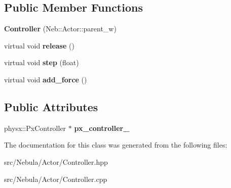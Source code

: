 \subsection*{\-Public \-Member \-Functions}
\begin{DoxyCompactItemize}
\item 
\hypertarget{classNeb_1_1Actor_1_1Controller_a0d5d6a76be71f3cf05c6e3d892719d3e}{{\bfseries \-Controller} (\-Neb\-::\-Actor\-::parent\-\_\-w)}\label{classNeb_1_1Actor_1_1Controller_a0d5d6a76be71f3cf05c6e3d892719d3e}

\item 
\hypertarget{classNeb_1_1Actor_1_1Controller_a4cf7cbd70138ea33c509d89ebc74e45d}{virtual void {\bfseries release} ()}\label{classNeb_1_1Actor_1_1Controller_a4cf7cbd70138ea33c509d89ebc74e45d}

\item 
\hypertarget{classNeb_1_1Actor_1_1Controller_a37d671a837e578ee05e2f9e1a5292e79}{virtual void {\bfseries step} (float)}\label{classNeb_1_1Actor_1_1Controller_a37d671a837e578ee05e2f9e1a5292e79}

\item 
\hypertarget{classNeb_1_1Actor_1_1Controller_aed64790b9ac840ebb4e6da3af3a6e405}{virtual void {\bfseries add\-\_\-force} ()}\label{classNeb_1_1Actor_1_1Controller_aed64790b9ac840ebb4e6da3af3a6e405}

\end{DoxyCompactItemize}
\subsection*{\-Public \-Attributes}
\begin{DoxyCompactItemize}
\item 
\hypertarget{classNeb_1_1Actor_1_1Controller_a488fba03acad68f997a3f38f4fac41fd}{physx\-::\-Px\-Controller $\ast$ {\bfseries px\-\_\-controller\-\_\-}}\label{classNeb_1_1Actor_1_1Controller_a488fba03acad68f997a3f38f4fac41fd}

\end{DoxyCompactItemize}


\-The documentation for this class was generated from the following files\-:\begin{DoxyCompactItemize}
\item 
src/\-Nebula/\-Actor/\-Controller.\-hpp\item 
src/\-Nebula/\-Actor/\-Controller.\-cpp\end{DoxyCompactItemize}

